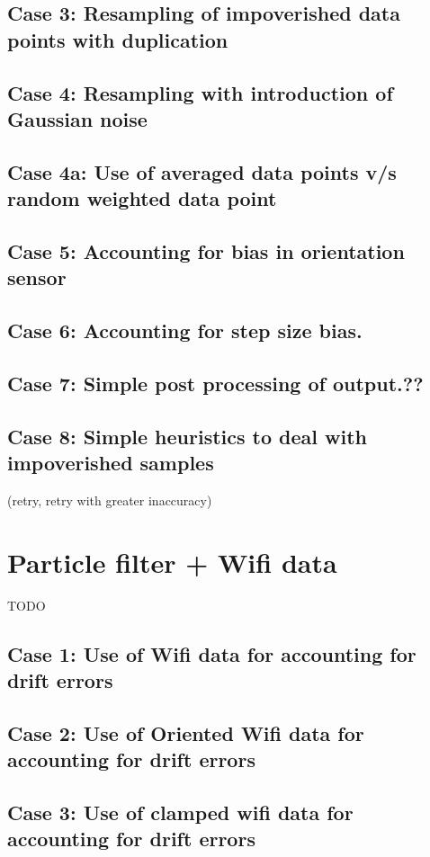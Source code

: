 \subsection{Case 3: Resampling of impoverished data points with duplication}
\subsection{Case 4: Resampling with introduction of Gaussian noise}
\subsection{Case 4a: Use of averaged data points v/s random weighted data point}
\subsection{Case 5: Accounting for bias in orientation sensor}
\subsection{Case 6: Accounting for step size bias.}
\subsection{Case 7: Simple post processing of output.??}
\subsection{Case 8: Simple heuristics to deal with impoverished samples}
(retry, retry with greater inaccuracy)

\section{Particle filter + Wifi data}
TODO

\subsection{Case 1: Use of Wifi data for accounting for drift errors}
\subsection{Case 2: Use of Oriented Wifi data for accounting for drift errors}
\subsection{Case 3: Use of clamped wifi data for accounting for drift errors}
